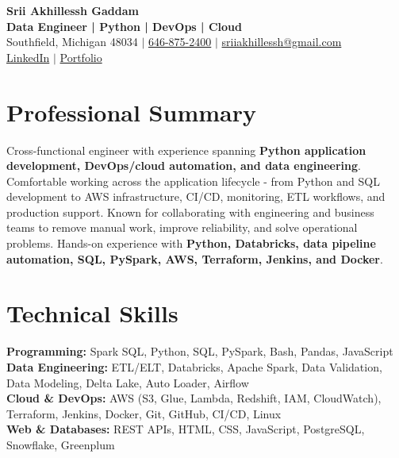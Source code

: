 \documentclass[letterpaper,10pt]{article}
\begin{document}
\fontsize{9.35pt}{10.45pt}\selectfont

\begin{center}
    {\LARGE \textbf{Srii Akhillessh Gaddam}} \\[-1pt]
    \textbf{Data Engineer | Python | DevOps | Cloud} \\[2pt]
    Southfield, Michigan 48034 $|$
    \href{tel:6468752400}{646-875-2400} $|$
    \href{mailto:sriiakhillessh@gmail.com}{sriiakhillessh@gmail.com} \\[1pt]
    \href{https://www.linkedin.com/in/srii-akhiilessh-gaddam-b48668191/}{LinkedIn} $|$
    \href{https://sriiakhillesshg.github.io/portfolio/}{Portfolio}
\end{center}
\vspace{-8pt}

\section{Professional Summary}
\small{Cross-functional engineer with experience spanning \textbf{Python application development, DevOps/cloud automation, and data engineering}. Comfortable working across the application lifecycle - from Python and SQL development to AWS infrastructure, CI/CD, monitoring, ETL workflows, and production support. Known for collaborating with engineering and business teams to remove manual work, improve reliability, and solve operational problems. Hands-on experience with \textbf{Python, Databricks, data pipeline automation, SQL, PySpark, AWS, Terraform, Jenkins, and Docker}.}

\section{Technical Skills}
\small{
\textbf{Programming:} Spark SQL, Python, SQL, PySpark, Bash, Pandas, JavaScript \\
\textbf{Data Engineering:} ETL/ELT, Databricks, Apache Spark, Data Validation, Data Modeling, Delta Lake, Auto Loader, Airflow \\
\textbf{Cloud \& DevOps:} AWS (S3, Glue, Lambda, Redshift, IAM, CloudWatch), Terraform, Jenkins, Docker, Git, GitHub, CI/CD, Linux \\
\textbf{Web \& Databases:} REST APIs, HTML, CSS, JavaScript, PostgreSQL, Snowflake, Greenplum
}

\end{document}
